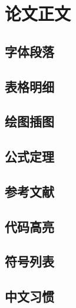 \chapter{论文正文}
\label{chap:main}


\section{字体段落}
\label{sec:font}



\section{表格明细}
\label{sec:figure}


\section{绘图插图}



\section{公式定理}
\label{sec:equation}


\section{参考文献}
\label{sec:bib}


\section{代码高亮}


\section{符号列表}


\section{中文习惯}
\label{sec:chinese}



